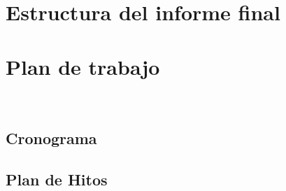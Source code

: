 \lipsum[20] \\
\lipsum[21] \\
\lipsum[22] \\
\lipsum[23] \\
\lipsum[24]

\clearpage

\section{Estructura del informe final}
\clearpage

\section{Plan de trabajo}
\lipsum[34] \\
\lipsum[35]

\subsection{Cronograma}
\subsection{Plan de Hitos}

\clearpage

